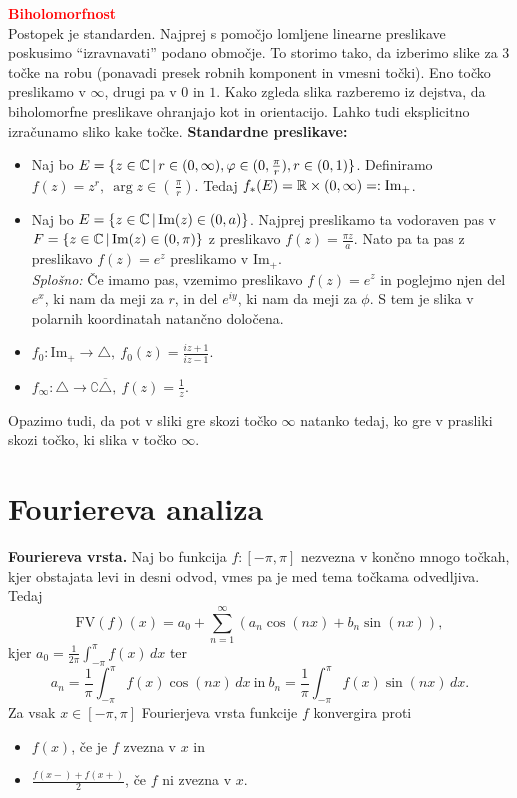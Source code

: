 \documentclass[a4paper,oneside,8pt,landscape]{extarticle}
\begin{document}
\begin{multicols*}{3}
\textbf{\textcolor{red}{Biholomorfnost}}\\
Postopek je standarden. Najprej s pomočjo lomljene linearne preslikave poskusimo "`izravnavati"' podano območje. To storimo tako, da izberimo slike za \(3\) točke na robu (ponavadi presek robnih komponent in vmesni točki). Eno točko preslikamo  v \(\infty\), drugi pa v \(0\) in \(1\). Kako zgleda slika razberemo iz dejstva, da biholomorfne preslikave ohranjajo kot in orientacijo. Lahko tudi eksplicitno izračunamo sliko kake točke.
\textbf{Standardne preslikave:}
\begin{itemize}
    \item Naj bo \(E = \{z \in \mathbb{C} \,|\, r \in (0, \infty), \varphi \in (0, \frac{\pi}{r}), r \in (0 ,1)\}\). Definiramo \(f(z) = z^r,\ \arg z \in (\, \frac{\pi}{r})\). Tedaj \(f_{*}(E) = \mathbb{R} \times (0, \infty) =: \text{Im}_+\).
    \item Naj bo \(E = \{z \in \mathbb{C} \,|\, \text{Im}(z) \in (0, a)\}\). Najprej preslikamo ta vodoraven pas v \(F = \{z \in \mathbb{C} \,|\, \text{Im}(z) \in (0, \pi)\} \) z preslikavo \(f(z) = \frac{\pi z}{a}\). Nato pa ta pas z preslikavo \(f(z) = e^z\) preslikamo v \(\text{Im}_+\).\\ 
    \emph{Splošno:} Če imamo pas, vzemimo preslikavo \(f(z) = e^z\) in poglejmo njen del \(e^x\), ki nam da meji za \(r\), in del \(e^{iy}\), ki nam da meji za \(\phi\). S tem je slika v polarnih koordinatah natančno določena.

    \item \(f_0: \text{Im}_+ \to \triangle,\ f_0(z) = \frac{iz+1}{iz-1}\).
    \item \(f_\infty: \triangle \to \complement{\overline{\triangle}},\ f(z) = \frac{1}{z}\).
\end{itemize}
Opazimo tudi, da pot v sliki gre skozi točko \(\infty\) natanko tedaj, ko gre v prasliki skozi točko, ki slika v točko \(\infty\).

\newpage
\section{Fouriereva analiza}
\textbf{Fouriereva vrsta.} Naj bo funkcija \(f: [-\pi, \pi]\) nezvezna v končno mnogo točkah, kjer obstajata levi in desni odvod, vmes pa je med tema točkama odvedljiva. Tedaj 
\[
    \text{FV}(f)(x) = a_0 + \sum_{n=1}^{\infty}(a_n \cos(nx) + b_n \sin(nx)),
\]
kjer \(a_0 = \frac{1}{2\pi} \int_{-\pi}^{\pi} f(x) \, dx\) ter 
\[a_n = \frac{1}{\pi} \int_{-\pi}^{\pi} f(x)  \cos(nx) \, dx\ \text{in}\ b_n = \frac{1}{\pi} \int_{-\pi}^{\pi} f(x)  \sin(nx) \, dx.\]
%
Za vsak \(x \in [-\pi, \pi]\) Fourierjeva vrsta funkcije \(f\) konvergira proti 
\begin{itemize}
    \item \(f(x)\), če je \(f\) zvezna v \(x\) in 
    \item \(\frac{f(x-) + f(x+)}{2}\), če \(f\) ni zvezna v \(x\).
\end{itemize}
%

\end{multicols*}
\end{document}
